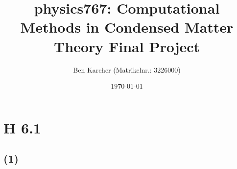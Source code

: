 \documentclass[ngerman]{scrartcl}
\title{physics767: Computational Methods in Condensed Matter Theory Final Project}
\author{Ben Karcher (Matrikelnr.: 3226000)}
\date{\today}
\begin{document}
\maketitle
\section*{H 6.1}
\subsection*{(1)}
\end{document}
